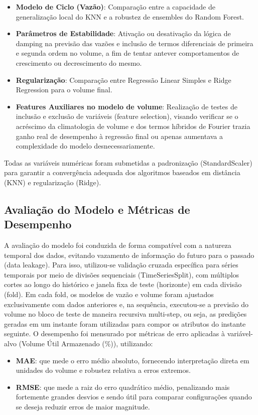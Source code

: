 \begin{itemize}
\item \textbf{Modelo de Ciclo (Vazão)}: Comparação entre a capacidade de generalização local do KNN e a robustez de ensembles do Random Forest.
\item \textbf{Parâmetros de Estabilidade}: Ativação ou desativação da lógica de damping na previsão das vazões e inclusão de termos diferenciais de primeira e segunda ordem no volume, a fim de tentar antever comportamentos de crescimento ou decrescimento do mesmo.
\item \textbf{Regularização}: Comparação entre Regressão Linear Simples e Ridge Regression para o volume final.
\item \textbf{Features Auxiliares no modelo de volume}: Realização de testes de inclusão e exclusão de variáveis (feature selection), visando verificar se o acréscimo da climatologia de volume e dos termos híbridos de Fourier trazia ganho real de desempenho à regressão final ou apenas aumentava a complexidade do modelo desnecessariamente.
\end{itemize}

Todas as variáveis numéricas foram submetidas a padronização (StandardScaler) para garantir a convergência adequada dos algoritmos baseados em distância (\acrshort{KNN}) e regularização (Ridge).

\subsection{Avaliação do Modelo e Métricas de Desempenho}

A avaliação do modelo foi conduzida de forma compatível com a natureza temporal dos dados, evitando vazamento de informação do futuro para o passado (data leakage). Para isso, utilizou-se validação cruzada específica para séries temporais por meio de divisões sequenciais (TimeSeriesSplit), com múltiplos cortes ao longo do histórico e janela fixa de teste (horizonte) em cada divisão (fold). Em cada fold, os modelos de vazão e volume foram ajustados exclusivamente com dados anteriores e, na sequência, executou-se a previsão do volume no bloco de teste de maneira recursiva multi-step, ou seja, as predições geradas em um instante foram utilizadas para compor os atributos do instante seguinte. O desempenho foi mensurado por métricas de erro aplicadas à variável-alvo (Volume Útil Armazenado (\%)), utilizando:

\begin{itemize}
\item \textbf{\acrfull{MAE}}: que mede o erro médio absoluto, fornecendo interpretação direta em unidades do volume e robustez relativa a erros extremos.
\item \textbf{\acrfull{RMSE}}: que mede a raiz do erro quadrático médio, penalizando mais fortemente grandes desvios e sendo útil para comparar configurações quando se deseja reduzir erros de maior magnitude.
\end{itemize}

